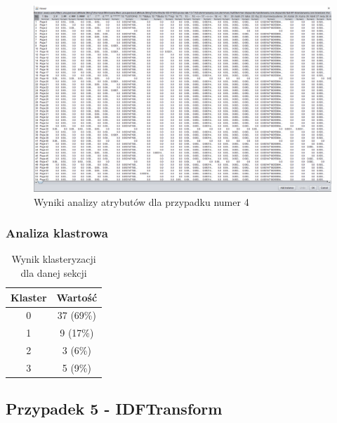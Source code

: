 \documentclass[../EDI_Task2_Karwowski_Kowalewski.tex]{subfiles}
\begin{document}
{{{            \begin{figure}[!htbp]
                \centering
                \includegraphics[width=\textwidth]{img/results2/weeia-case4.png}
                \caption{Wyniki analizy atrybutów dla przypadku numer 4}
            \end{figure}
            \FloatBarrier
        }

        \subsubsection{Analiza klastrowa} {

            \begin{table}[!htbp]
                \small
                \centering
                \begin{tabular}{|c|c|}
                    \hline
                    Klaster & Wartość \\ \hline
                    0   &   37 (69\%) \\
                    1   &    9 (17\%) \\
                    2   &    3 (6\%) \\
                    3   &    5 (9\%) \\ \hline
                \end{tabular}
                \caption{Wynik klasteryzacji dla danej sekcji}
            \end{table}
            \FloatBarrier
        }
    }

    \subsection{Przypadek 5 - IDFTransform} {

}}
\end{document}

